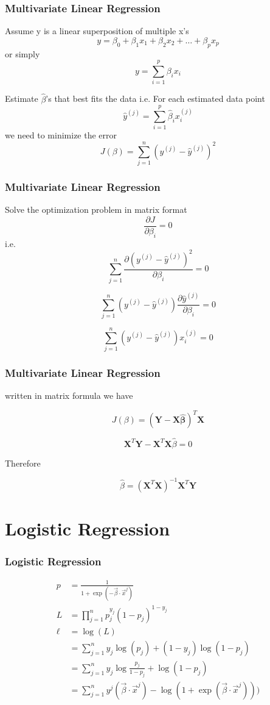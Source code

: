 \documentclass[notheorems, aspectratio=54]{beamer}
\begin{document}
\begin{frame}
\frametitle{Multivariate Linear Regression}
Assume y is a linear superposition of multiple x's
    $$
	y=\beta_{0}+\beta_{1}x_1+\beta_{2}x_2+\hdots+\beta_{p}x_p
    $$
    or simply
    $$
	y=\sum\limits_{i=1}^{p}\beta_i x_i     
	$$
        
   	Estimate $\hat{\beta}$'s that best fits the data i.e.
   	For each estimated data point
   	$$
	\hat{y}^{(j)}=\sum\limits_{i=1}^{p}\hat{\beta}_i x^{(j)}_i     
	$$
    we need to minimize the error 
    $$
    J(\beta)=\sum\limits_{j=1}^{n}(y^{(j)}-\hat{y}^{(j)})^2
    $$

\end{frame}

\begin{frame}
\frametitle{Multivariate Linear Regression}

Solve the optimization problem in matrix format
$$
\frac{\partial J}{\partial \beta_i}=0
$$
i.e.
$$
\sum\limits_{j=1}^{n}\frac{\partial (y^{(j)}-\hat{y}^{(j)})^2}{\partial \beta_i}=0
$$

$$
\sum\limits_{j=1}^{n}(y^{(j)}-\hat{y}^{(j)})\frac{\partial\hat{y}^{(j)}}{\partial \beta_i}=0
$$

$$
\sum\limits_{j=1}^{n}(y^{(j)}-\hat{y}^{(j)})x^{(j)}_{i}=0
$$

\end{frame}

\begin{frame}

\frametitle{Multivariate Linear Regression}

written in matrix formula we have

$$
J(\beta)=\mathbf{({Y}-{X\hat{\beta}})}^{T}\mathbf{X}
$$

$$
\mathbf{X}^{T}\mathbf{Y}-\mathbf{X}^T\mathbf{X}\hat{\beta}=0
$$

Therefore 

$$
\hat{\beta}=(\mathbf{X}^T\mathbf{X})^{-1}\mathbf{X}^{T}\mathbf{Y}
$$

\end{frame}

\section{Logistic Regression}

\begin{frame}

\frametitle{Logistic Regression}
\begin{align*}
p&=\frac{1}{1+\exp(-\vec{\beta}\cdot\vec{x}^j)}\\
L&=\prod_{j=1}^{n}p_{j}^{y_j}(1-p_{j})^{1-y_{j}}\\
\ell&=\log(L)\\
&=\sum_{j=1}^{n}y_j\log(p_j)+(1-y_j)\log(1-p_j)\\
&=\sum_{j=1}^{n}y_j\log\frac{p_j}{1-p_j}+\log(1-p_j)\\
&=\sum_{j=1}^{n}y^j(\vec{\beta}\cdot\vec{x}^j)-\log(1+\exp(\vec{\beta}\cdot\vec{x}^j)))
\end{align*}

\end{frame}
\end{document}
